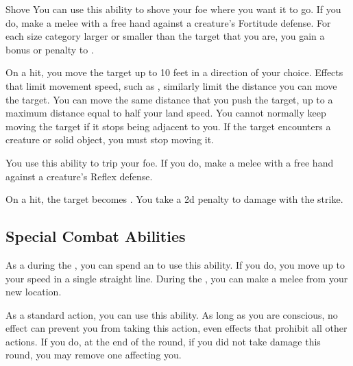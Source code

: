             \begin{ability}{Shove}\label{Shove}
                You can use this ability to shove your foe where you want it to go.
                If you do, make a melee  with a free hand against a creature's Fortitude defense.
                For each size category larger or smaller than the target that you are, you gain a  bonus or penalty to .

                On a hit, you move the target up to 10 feet in a direction of your choice.
                Effects that limit movement speed, such as , similarly limit the distance you can move the target.
                You can move the same distance that you push the target, up to a maximum distance equal to half your land speed.
                You cannot normally keep moving the target if it stops being adjacent to you.
                If the target encounters a creature or solid object, you must stop moving it.
            \end{ability}

            \begin{ability}{}
                You use this ability to trip your foe.
                If you do, make a melee  with a free hand against a creature's Reflex defense.

                On a hit, the target becomes \prone.
                You take a \minus2d penalty to damage with the strike.
            \end{ability}

    \subsection{Special Combat Abilities}

        \begin{ability}{}
            As a  during the , you can spend an  to use this ability.
            If you do, you move up to your speed in a single straight line.
            During the , you can make a melee  from your new location.
        \end{ability}

        \begin{ability}{}
            As a standard action, you can use this ability.
            As long as you are conscious, no effect can prevent you from taking this action, even effects that prohibit all other actions.
            If you do, at the end of the round, if you did not take damage this round, you may remove one  affecting you.
        \end{ability}

